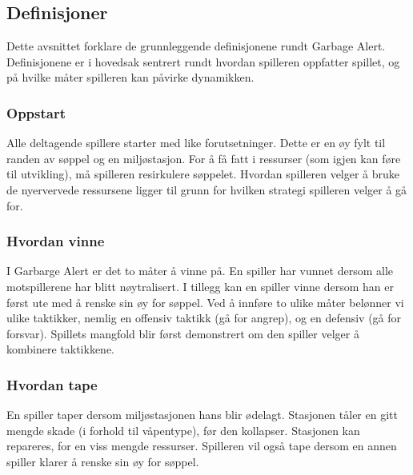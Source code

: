 \subsection{Definisjoner}
Dette avsnittet forklare de grunnleggende definisjonene rundt Garbage
Alert. Definisjonene er i hovedsak sentrert rundt hvordan spilleren
oppfatter spillet, og på hvilke måter spilleren kan påvirke dynamikken.
\subsubsection{Oppstart}
Alle deltagende spillere starter med like forutsetninger. Dette er en øy
fylt til randen av søppel og en miljøstasjon. For å få fatt i ressurser
(som igjen kan føre til utvikling), må spilleren resirkulere søppelet.
Hvordan spilleren velger å bruke de nyervervede ressursene ligger til
grunn for hvilken strategi spilleren velger å gå for.
\subsubsection{Hvordan vinne}
I Garbarge Alert er det to måter å vinne på. En spiller har vunnet
dersom alle motspillerene har blitt nøytralisert. I tillegg kan en
spiller vinne dersom han er først ute med å renske sin øy for søppel.
Ved å innføre to ulike måter belønner vi ulike taktikker, nemlig en
offensiv taktikk (gå for angrep), og en defensiv (gå for forsvar).
Spillets mangfold blir først demonstrert om den spiller velger å
kombinere taktikkene.
\subsubsection{Hvordan tape}
En spiller taper dersom miljøstasjonen hans blir ødelagt. Stasjonen
tåler en gitt mengde skade (i forhold til våpentype), før den kollapser.
Stasjonen kan repareres, for en viss mengde ressurser.
Spilleren vil også tape dersom en annen spiller klarer å renske sin øy
for søppel.
